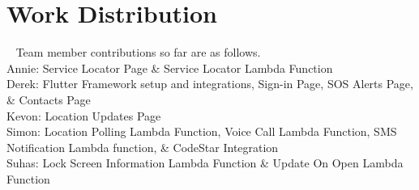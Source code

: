 \documentclass[10pt, a4paper]{article}
\begin{document}
\section{Work Distribution}
\par ~ Team member contributions so far are as follows. \\
Annie: Service Locator Page \& Service Locator Lambda Function \\
Derek: Flutter Framework setup and integrations, Sign-in Page, SOS Alerts Page, \& Contacts Page \\
Kevon: Location Updates Page \\
Simon: Location Polling Lambda Function, Voice Call Lambda Function, SMS Notification Lambda function, \& CodeStar Integration \\
Suhas: Lock Screen Information Lambda Function \& Update On Open Lambda Function \\ 
\end{document}
